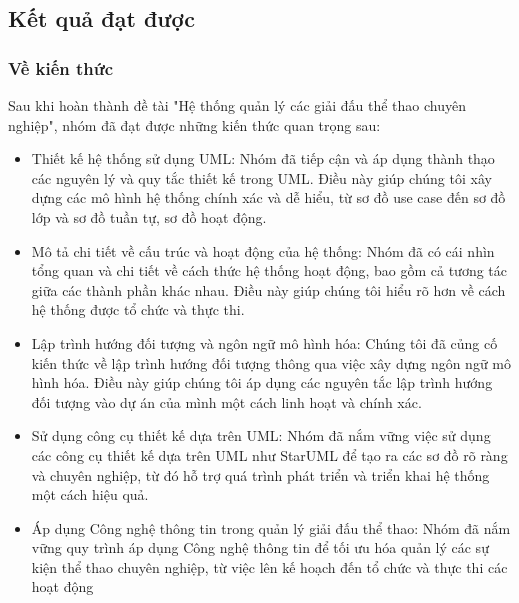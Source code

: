 {}
\setcounter{section}{6}

\subsection{Kết quả đạt được}
\setcounter{subsubsection}{0}
\subsubsection{Về kiến thức}
Sau khi hoàn thành đề tài "Hệ thống quản lý các giải đấu thể thao chuyên nghiệp", nhóm đã đạt được những kiến thức quan trọng sau:
\begin{itemize}[label={--}]
  \item Thiết kế hệ thống sử dụng UML: Nhóm đã tiếp cận và áp dụng thành thạo các nguyên lý và quy tắc thiết kế trong UML. Điều này giúp chúng tôi xây dựng các mô hình hệ thống chính xác và dễ hiểu, từ sơ đồ use case đến sơ đồ lớp và sơ đồ tuần tự, sơ đồ hoạt động.
  \item Mô tả chi tiết về cấu trúc và hoạt động của hệ thống: Nhóm đã có cái nhìn tổng quan và chi tiết về cách thức hệ thống hoạt động, bao gồm cả tương tác giữa các thành phần khác nhau. Điều này giúp chúng tôi hiểu rõ hơn về cách hệ thống được tổ chức và thực thi.
  \item Lập trình hướng đối tượng và ngôn ngữ mô hình hóa: Chúng tôi đã củng cố kiến thức về lập trình hướng đối tượng thông qua việc xây dựng ngôn ngữ mô hình hóa. Điều này giúp chúng tôi áp dụng các nguyên tắc lập trình hướng đối tượng vào dự án của mình một cách linh hoạt và chính xác.
  \item Sử dụng công cụ thiết kế dựa trên UML: Nhóm đã nắm vững việc sử dụng các công cụ thiết kế dựa trên UML như StarUML để tạo ra các sơ đồ rõ ràng và chuyên nghiệp, từ đó hỗ trợ quá trình phát triển và triển khai hệ thống một cách hiệu quả.
  \item Áp dụng Công nghệ thông tin trong quản lý giải đấu thể thao: Nhóm đã nắm vững quy trình áp dụng Công nghệ thông tin để tối ưu hóa quản lý các sự kiện thể thao chuyên nghiệp, từ việc lên kế hoạch đến tổ chức và thực thi các hoạt động
\end{itemize}

